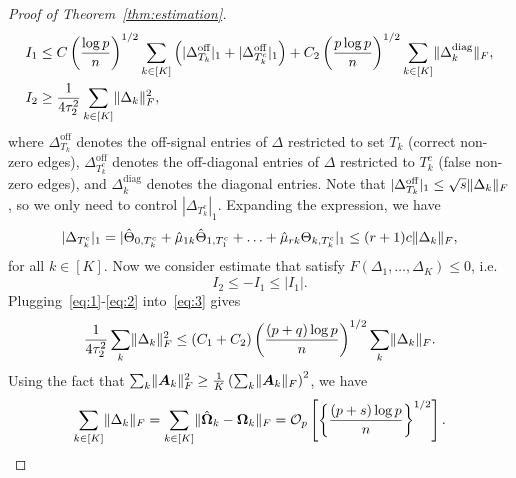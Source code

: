 \documentclass[11pt]{article}
\theoremstyle{plain}
\theoremstyle{definition}
\begin{document}
\begin{proof}[Proof of Theorem~\ref{thm:estimation}]
\begin{align}
I_1&\leq C\left( {\log p \over n}\right)^{1/2} \sum_{k\in[K]}\left( |\Delta^{\text{off}}_{T_k}|_1+|\Delta^{\text{off}}_{T^c_k}|_1\right) + C_2\left({p\log p\over n} \right)^{1/2}\sum_{k\in[K]}\lVert\Delta^{\text{diag}}_k\rVert_F,\notag\\
 I_2&\geq {1\over 4\tau^2_2}\sum_{k\in[K]}\lVert\Delta_k\rVert_F^2,
\end{align}
where $\Delta^{\text{off}}_{T_k}$ denotes the off-signal entries of $\Delta$ restricted to set $T_k$ (correct non-zero edges), $\Delta^{\text{off}}_{T^c_k}$ denotes the off-diagonal entries of $\Delta$ restricted to $T^c_k$ (false non-zero edges), and $\Delta^{\text{diag}}_k$ denotes the diagonal entries.  
Note that $|\Delta^{\text{off}}_{T_k}|_1 \leq \sqrt{s}\lVert\Delta_k\rVert_F$, so we only need to control $|\Delta_{T^c_k}|_1$. Expanding the expression, we have
\begin{equation}\label{eq:2}
|\Delta_{T^c_k}|_1=|\hat \Theta_{0,T^c_k}+\hat \mu_{1k}\hat \Theta_{1,T^c_1}+\ldots+\hat \mu_{rk}\Theta_{k,T^c_k}|_1\leq (r+1)c\lVert\Delta_k\rVert_F, 
\end{equation}
for all $k\in[K]$. Now we consider estimate that satisfy $F(\Delta_1,\ldots,\Delta_K)\leq 0$, i.e.
\begin{equation}\label{eq:3}
I_2\leq -I_1\leq|I_1|.
\end{equation}
Plugging~\eqref{eq:1}-\eqref{eq:2} into~\eqref{eq:3} gives
\[
{1\over 4\tau^2_2}\sum_k\lVert\Delta_k\rVert_F^2\leq (C_1+C_2)\left( {(p+q)\log p\over n}\right)^{1/2}\sum_k\lVert\Delta_k\rVert_F.
\]
Using the fact that $\sum_k\lVert\bm A_k\rVert_F^2\geq {1\over K} \left( \sum_k\lVert\bm A_k\rVert_F \right)^2$, we have
\[
\sum_{k\in[K]}\lVert\Delta_k\rVert_F=\sum_{k\in[K]}\lVert\hat {\bm \Omega}_k-\bm \Omega_k\rVert_F = \mathcal{O}_p\left[{\left\{ (p+s)\log p \over n\right\}}^{1/2} \right].
\]
\end{proof}

    
\end{document}
